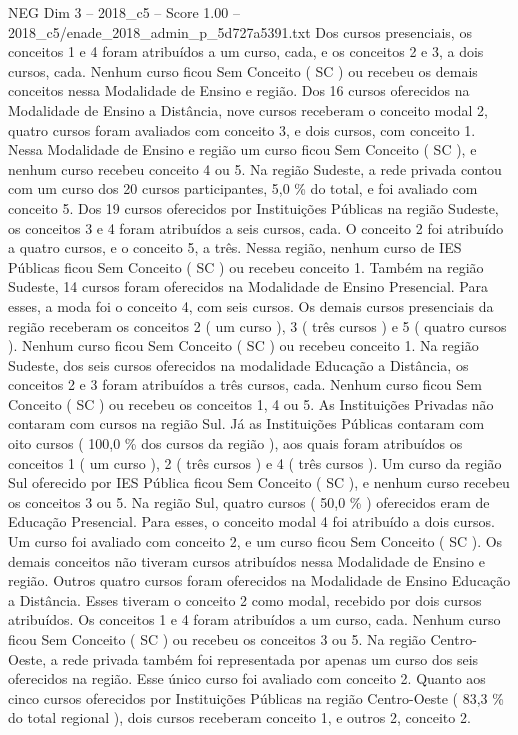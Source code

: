 \begin{textsample}{NEG Dim 3 – 2018\_c5 – Score 1.00 – 2018\_c5/enade\_2018\_admin\_p\_5d727a5391.txt}
Dos cursos presenciais, os conceitos 1 e 4 foram atribuídos a um curso, cada, e os conceitos 2 e 3, a dois cursos, cada.
Nenhum curso ficou Sem Conceito ( SC ) ou recebeu os demais conceitos nessa Modalidade de Ensino e região.
Dos 16 cursos oferecidos na Modalidade de Ensino a Distância, nove cursos receberam o conceito modal 2, quatro cursos foram avaliados com conceito 3, e dois cursos, com conceito 1.
Nessa Modalidade de Ensino e região um curso ficou Sem Conceito ( SC ), e nenhum curso recebeu conceito 4 ou 5.
Na região Sudeste, a rede privada contou com um curso dos 20 cursos participantes, 5,0 \% do total, e foi avaliado com conceito 5.
Dos 19 cursos oferecidos por Instituições Públicas na região Sudeste, os conceitos 3 e 4 foram atribuídos a seis cursos, cada.
O conceito 2 foi atribuído a quatro cursos, e o conceito 5, a três.
Nessa região, nenhum curso de IES Públicas ficou Sem Conceito ( SC ) ou recebeu conceito 1.
Também na região Sudeste, 14 cursos foram oferecidos na Modalidade de Ensino Presencial.
Para esses, a moda foi o conceito 4, com seis cursos.
Os demais cursos presenciais da região receberam os conceitos 2 ( um curso ), 3 ( três cursos ) e 5 ( quatro cursos ).
Nenhum curso ficou Sem Conceito ( SC ) ou recebeu conceito 1.
Na região Sudeste, dos seis cursos oferecidos na modalidade Educação a Distância, os conceitos 2 e 3 foram atribuídos a três cursos, cada.
Nenhum curso ficou Sem Conceito ( SC ) ou recebeu os conceitos 1, 4 ou 5.
As Instituições Privadas não contaram com cursos na região Sul.
Já as Instituições Públicas contaram com oito cursos ( 100,0 \% dos cursos da região ), aos quais foram atribuídos os conceitos 1 ( um curso ), 2 ( três cursos ) e 4 ( três cursos ).
Um curso da região Sul oferecido por IES Pública ficou Sem Conceito ( SC ), e nenhum curso recebeu os conceitos 3 ou 5.
Na região Sul, quatro cursos ( 50,0 \% ) oferecidos eram de Educação Presencial.
Para esses, o conceito modal 4 foi atribuído a dois cursos.
Um curso foi avaliado com conceito 2, e um curso ficou Sem Conceito ( SC ).
Os demais conceitos não tiveram cursos atribuídos nessa Modalidade de Ensino e região.
Outros quatro cursos foram oferecidos na Modalidade de Ensino Educação a Distância.
Esses tiveram o conceito 2 como modal, recebido por dois cursos atribuídos.
Os conceitos 1 e 4 foram atribuídos a um curso, cada.
Nenhum curso ficou Sem Conceito ( SC ) ou recebeu os conceitos 3 ou 5.
Na região Centro-Oeste, a rede privada também foi representada por apenas um curso dos seis oferecidos na região.
Esse único curso foi avaliado com conceito 2.
Quanto aos cinco cursos oferecidos por Instituições Públicas na região Centro-Oeste ( 83,3 \% do total regional ), dois cursos receberam conceito 1, e outros 2, conceito 2.

\end{textsample}
